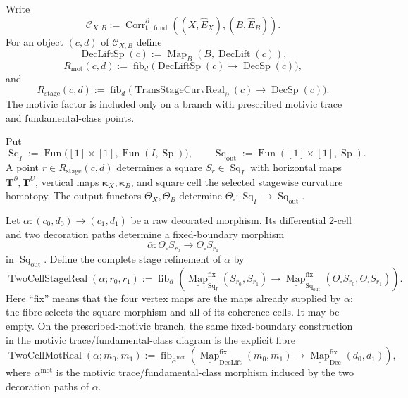 \begin{construction}
\label{constr:prequantum-refined-decorated-hom-category}
Write
\[
\mathcal C_{X,B}
:=
\operatorname{Corr}^{\partial}_{\mathrm{tr,fund}}
((X,\widehat E_X),(B,\widehat E_B)).
\]
For an object $(c,d)$ of $\mathcal C_{X,B}$ define
\[
\operatorname{DecLiftSp}(c)
:=
\operatorname{Map}_B(B,\operatorname{DecLift}(c)),
\]
\[
R_{\mathrm{mot}}(c,d)
:=
\operatorname{fib}_{d}
\bigl(\operatorname{DecLiftSp}(c)\to\operatorname{DecSp}(c)\bigr),
\]
and
\[
R_{\mathrm{stage}}(c,d)
:=
\operatorname{fib}_{d}
\bigl(
\operatorname{TransStageCurvReal}_{\partial}(c)
\longrightarrow\operatorname{DecSp}(c)
\bigr).
\]
The motivic factor is included only on a branch with prescribed motivic trace
and fundamental-class points.

Put
\[
\operatorname{Sq}_I
:=
\operatorname{Fun}
\bigl([1]\times[1],\operatorname{Fun}(I,\operatorname{Sp})\bigr),
\qquad
\operatorname{Sq}_{\mathrm{out}}
:=
\operatorname{Fun}([1]\times[1],\operatorname{Sp}).
\]
A point $r\in R_{\mathrm{stage}}(c,d)$ determines a square
$S_r\in\operatorname{Sq}_I$ with horizontal maps
$\mathbf T^\partial,\mathbf T^U$, vertical maps
$\mathbf\kappa_X,\mathbf\kappa_B$, and square cell the selected stagewise
curvature homotopy.  The output functors $\Theta_X,\Theta_B$ determine
$\Theta_\square:\operatorname{Sq}_I\to\operatorname{Sq}_{\mathrm{out}}$.

Let $\alpha:(c_0,d_0)\to(c_1,d_1)$ be a raw decorated morphism.  Its
differential $2$-cell and two decoration paths determine a fixed-boundary
morphism
\[
\overline\alpha:
\Theta_\square S_{r_0}\longrightarrow\Theta_\square S_{r_1}
\]
in $\operatorname{Sq}_{\mathrm{out}}$.  Define the complete stage refinement
of $\alpha$ by
\[
\boxed{
\operatorname{TwoCellStageReal}(\alpha;r_0,r_1)
:=
\operatorname{fib}_{\overline\alpha}
\left(
\underline{\operatorname{Map}}^{\mathrm{fix}}_{\operatorname{Sq}_I}
(S_{r_0},S_{r_1})
\longrightarrow
\underline{\operatorname{Map}}^{\mathrm{fix}}_{\operatorname{Sq}_{\mathrm{out}}}
(\Theta_\square S_{r_0},\Theta_\square S_{r_1})
\right).
}
\]
Here ``fix'' means that the four vertex maps are the maps already supplied by
$\alpha$; the fibre selects the square morphism and all of its coherence cells.
It may be empty.  On the prescribed-motivic branch, the same fixed-boundary
construction in the motivic trace/fundamental-class diagram is the explicit
fibre
\[
\boxed{
\operatorname{TwoCellMotReal}(\alpha;m_0,m_1)
:=
\operatorname{fib}_{\overline\alpha^{\mathrm{mot}}}
\left(
\underline{\operatorname{Map}}^{\mathrm{fix}}
_{\operatorname{DecLift}}(m_0,m_1)
\longrightarrow
\underline{\operatorname{Map}}^{\mathrm{fix}}
_{\operatorname{Dec}}(d_0,d_1)
\right),
}
\]
where $\overline\alpha^{\mathrm{mot}}$ is the motivic trace/fundamental-class
morphism induced by the two decoration paths of $\alpha$.


\end{construction}
